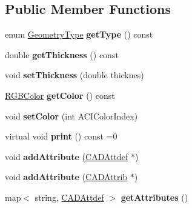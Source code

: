 \subsection*{Public Member Functions}
\begin{DoxyCompactItemize}
\item 
enum \hyperlink{class_c_a_d_geometry_a0515ed61d3514d528f78b8ba6c4fc5f3}{Geometry\+Type} {\bfseries get\+Type} () const \hypertarget{class_c_a_d_geometry_a17ef31adb00b91060cf27595c8df6330}{}\label{class_c_a_d_geometry_a17ef31adb00b91060cf27595c8df6330}

\item 
double {\bfseries get\+Thickness} () const \hypertarget{class_c_a_d_geometry_afb804aa9994b188d8ea4728076c29964}{}\label{class_c_a_d_geometry_afb804aa9994b188d8ea4728076c29964}

\item 
void {\bfseries set\+Thickness} (double thicknes)\hypertarget{class_c_a_d_geometry_abd3022d752e37dac79b92519a15a7fe2}{}\label{class_c_a_d_geometry_abd3022d752e37dac79b92519a15a7fe2}

\item 
\hyperlink{struct_r_g_b_color}{R\+G\+B\+Color} {\bfseries get\+Color} () const \hypertarget{class_c_a_d_geometry_a1f77b5cdf9479129ccbc69d19be5d65e}{}\label{class_c_a_d_geometry_a1f77b5cdf9479129ccbc69d19be5d65e}

\item 
void {\bfseries set\+Color} (int A\+C\+I\+Color\+Index)\hypertarget{class_c_a_d_geometry_a894393c4f6fece4b7e9256aaa5448770}{}\label{class_c_a_d_geometry_a894393c4f6fece4b7e9256aaa5448770}

\item 
virtual void {\bfseries print} () const  =0\hypertarget{class_c_a_d_geometry_aece81ef419d3ad207171bcca57a097dd}{}\label{class_c_a_d_geometry_aece81ef419d3ad207171bcca57a097dd}

\item 
void {\bfseries add\+Attribute} (\hyperlink{class_c_a_d_attdef}{C\+A\+D\+Attdef} $\ast$)\hypertarget{class_c_a_d_geometry_aa9ae152b28fa7e33d547796fe72c991f}{}\label{class_c_a_d_geometry_aa9ae152b28fa7e33d547796fe72c991f}

\item 
void {\bfseries add\+Attribute} (\hyperlink{class_c_a_d_attrib}{C\+A\+D\+Attrib} $\ast$)\hypertarget{class_c_a_d_geometry_a0c4b7c01d57665e65ed0689cc598593a}{}\label{class_c_a_d_geometry_a0c4b7c01d57665e65ed0689cc598593a}

\item 
map$<$ string, \hyperlink{class_c_a_d_attdef}{C\+A\+D\+Attdef} $>$ {\bfseries get\+Attributes} ()\hypertarget{class_c_a_d_geometry_a38ff1804c40b9d6d683bbd06a9715523}{}\label{class_c_a_d_geometry_a38ff1804c40b9d6d683bbd06a9715523}

\end{DoxyCompactItemize}
